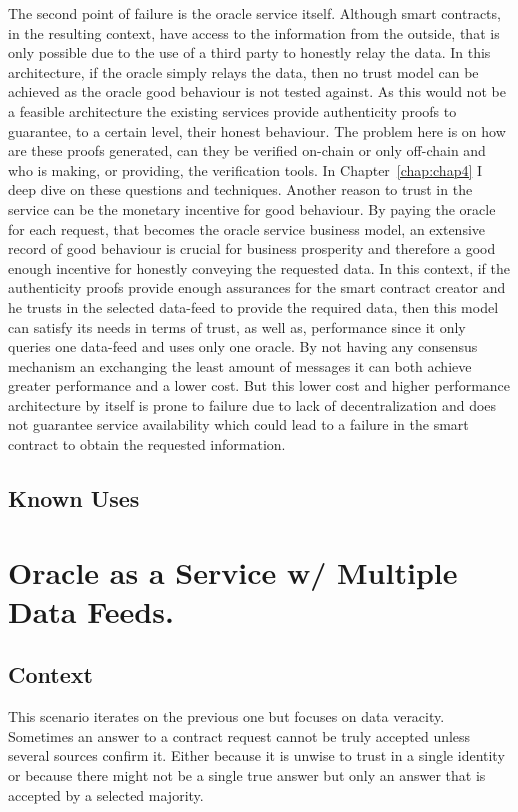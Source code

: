 The second point of failure is the oracle service itself. Although smart contracts, in the resulting context, have access to the information from the outside, that is only possible due to the use of a third party to honestly relay the data. In this architecture, if the oracle simply relays the data, then no trust model can be achieved as the oracle good behaviour is not tested against. As this would not be a feasible architecture the existing services provide authenticity proofs to guarantee, to a certain level, their honest behaviour. The problem here is on how are these proofs generated, can they be verified on-chain or only off-chain and who is making, or providing, the verification tools. In Chapter~\ref{chap:chap4} I deep dive on these questions and techniques. Another reason to trust in the service can be the monetary incentive for good behaviour. By paying the oracle for each request, that becomes the oracle service business model, an extensive record of good behaviour is crucial for business prosperity and therefore a good enough incentive for honestly conveying the requested data.
In this context, if the authenticity proofs provide enough assurances for the smart contract creator and he trusts in the selected data-feed to provide the required data, then this model can satisfy its needs in terms of trust, as well as, performance since it only queries one data-feed and uses only one oracle. By not having any consensus mechanism an exchanging the least amount of messages it can both achieve greater performance and a lower cost. But this lower cost and higher performance architecture by itself is prone to failure due to lack of decentralization and does not guarantee service availability which could lead to a failure in the smart contract to obtain the requested information.

\subsection{Known Uses}


\section{Oracle as a Service w/ Multiple Data Feeds.}\label{OaaSwMultipleDataFeed}

\subsection{Context}
This scenario iterates on the previous one but focuses on data veracity. Sometimes an answer to a contract request cannot be truly accepted unless several sources confirm it. Either because it is unwise to trust in a single identity or because there might not be a single true answer but only an answer that is accepted by a selected majority.

